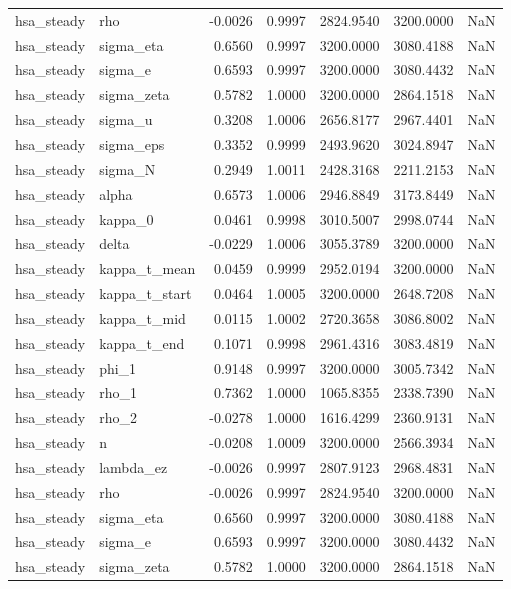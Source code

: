 \begin{tabular}{llrrrrl}
hsa\_steady & rho & -0.0026 & 0.9997 & 2824.9540 & 3200.0000 & NaN \\
hsa\_steady & sigma\_eta & 0.6560 & 0.9997 & 3200.0000 & 3080.4188 & NaN \\
hsa\_steady & sigma\_e & 0.6593 & 0.9997 & 3200.0000 & 3080.4432 & NaN \\
hsa\_steady & sigma\_zeta & 0.5782 & 1.0000 & 3200.0000 & 2864.1518 & NaN \\
hsa\_steady & sigma\_u & 0.3208 & 1.0006 & 2656.8177 & 2967.4401 & NaN \\
hsa\_steady & sigma\_eps & 0.3352 & 0.9999 & 2493.9620 & 3024.8947 & NaN \\
hsa\_steady & sigma\_N & 0.2949 & 1.0011 & 2428.3168 & 2211.2153 & NaN \\
hsa\_steady & alpha & 0.6573 & 1.0006 & 2946.8849 & 3173.8449 & NaN \\
hsa\_steady & kappa\_0 & 0.0461 & 0.9998 & 3010.5007 & 2998.0744 & NaN \\
hsa\_steady & delta & -0.0229 & 1.0006 & 3055.3789 & 3200.0000 & NaN \\
hsa\_steady & kappa\_t\_mean & 0.0459 & 0.9999 & 2952.0194 & 3200.0000 & NaN \\
hsa\_steady & kappa\_t\_start & 0.0464 & 1.0005 & 3200.0000 & 2648.7208 & NaN \\
hsa\_steady & kappa\_t\_mid & 0.0115 & 1.0002 & 2720.3658 & 3086.8002 & NaN \\
hsa\_steady & kappa\_t\_end & 0.1071 & 0.9998 & 2961.4316 & 3083.4819 & NaN \\
hsa\_steady & phi\_1 & 0.9148 & 0.9997 & 3200.0000 & 3005.7342 & NaN \\
hsa\_steady & rho\_1 & 0.7362 & 1.0000 & 1065.8355 & 2338.7390 & NaN \\
hsa\_steady & rho\_2 & -0.0278 & 1.0000 & 1616.4299 & 2360.9131 & NaN \\
hsa\_steady & n & -0.0208 & 1.0009 & 3200.0000 & 2566.3934 & NaN \\
hsa\_steady & lambda\_ez & -0.0026 & 0.9997 & 2807.9123 & 2968.4831 & NaN \\
hsa\_steady & rho & -0.0026 & 0.9997 & 2824.9540 & 3200.0000 & NaN \\
hsa\_steady & sigma\_eta & 0.6560 & 0.9997 & 3200.0000 & 3080.4188 & NaN \\
hsa\_steady & sigma\_e & 0.6593 & 0.9997 & 3200.0000 & 3080.4432 & NaN \\
hsa\_steady & sigma\_zeta & 0.5782 & 1.0000 & 3200.0000 & 2864.1518 & NaN \\

\end{tabular}

